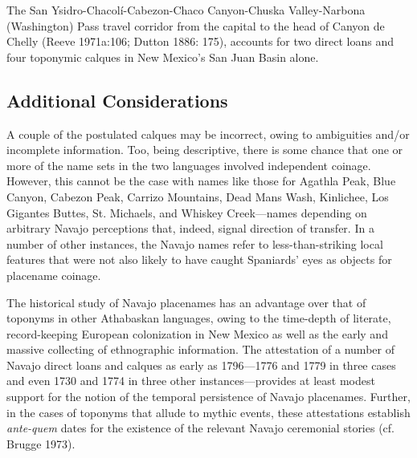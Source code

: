   The San Ysidro-Chacolí-Cabezon-Chaco Canyon-Chuska Valley-Narbona (Washington) Pass travel corridor from the capital to the head of Canyon de Chelly (Reeve 1971a:106; Dutton 1886: 175), accounts for two direct loans and four toponymic calques in New Mexico’s San Juan Basin alone.

\subsection{Additional Considerations}
A couple of the postulated calques may be incorrect, owing to ambiguities and/or incomplete information.  Too, being descriptive, there is some chance that one or more of the name sets in the two languages involved independent coinage.  However, this cannot be the case with names like those for Agathla Peak, Blue Canyon, Cabezon Peak, Carrizo Mountains, Dead Mans Wash, Kinlichee, Los Gigantes Buttes, St. Michaels, and Whiskey Creek—names depending on arbitrary Navajo perceptions that, indeed, signal direction of transfer. In a number of other instances, the Navajo names refer to less-than-striking local features that were not also likely to have caught Spaniards' eyes as objects for placename coinage.

  The historical study of Navajo placenames has an advantage over that of toponyms in other Athabaskan languages, owing to the time-depth of literate, record-keeping European colonization in New Mexico as well as the early and massive collecting of ethnographic information.  The attestation of a number of Navajo direct loans and calques as early as 1796—1776 and 1779 in three cases and even 1730 and 1774 in three other instances—provides at least modest support for the notion of the temporal persistence of Navajo placenames.  Further, in the cases of toponyms that allude to mythic events, these attestations establish \textit{ante-quem} dates for the existence of the relevant Navajo ceremonial stories (cf. Brugge 1973).

